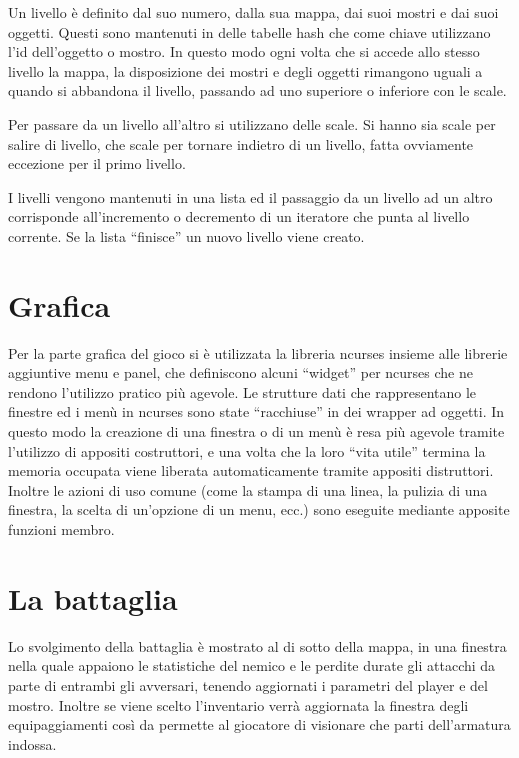 \documentclass[10pt]{report}
\begin{document}
Un livello è definito dal suo numero, dalla sua mappa, dai suoi mostri e dai suoi oggetti. Questi sono mantenuti in
delle tabelle hash che come chiave utilizzano l'id dell'oggetto o mostro. In questo modo ogni volta che si accede allo
stesso livello la mappa, la disposizione dei mostri e degli oggetti rimangono uguali a quando si abbandona il livello,
passando ad uno superiore o inferiore con le scale.

Per passare da un livello all'altro si utilizzano delle scale. Si hanno sia scale per salire di livello, che scale per
tornare indietro di un livello, fatta ovviamente eccezione per il primo livello.

I livelli vengono mantenuti in una lista ed il passaggio da un livello ad un altro corrisponde all'incremento o
decremento di un iteratore che punta al livello corrente. Se la lista ``finisce'' un nuovo livello viene creato.

\section{Grafica}

Per la parte grafica del gioco si è utilizzata la libreria ncurses insieme alle librerie aggiuntive menu e
panel, che definiscono alcuni ``widget'' per ncurses che ne rendono l'utilizzo pratico più agevole. Le strutture dati che
rappresentano le finestre ed i menù in ncurses sono state ``racchiuse'' in dei wrapper ad oggetti. In questo modo la
creazione di una finestra o di un menù è resa più agevole tramite l'utilizzo di appositi costruttori, e una volta che
la loro ``vita utile'' termina la memoria occupata viene liberata automaticamente tramite appositi distruttori. Inoltre le
azioni di uso comune (come la stampa di una linea, la pulizia di una finestra, la scelta di un'opzione di un menu,
ecc.) sono eseguite mediante apposite funzioni membro.

\section{La battaglia}

Lo svolgimento della battaglia è mostrato al di sotto della mappa, in una finestra nella quale appaiono le statistiche del nemico e le perdite durate gli attacchi da parte di entrambi gli avversari, tenendo aggiornati i parametri del player e del mostro. Inoltre se viene scelto l'inventario verrà aggiornata la finestra degli equipaggiamenti così da permette al giocatore di visionare che parti dell'armatura indossa.
\end{document}
